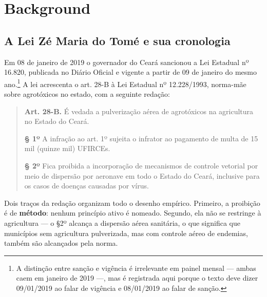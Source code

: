 %
%

\section{Background}
\label{sec:background}

\subsection{A Lei Zé Maria do Tomé e sua cronologia}
\label{sub:lei}

Em 08 de janeiro de 2019 o governador do Ceará sancionou a Lei Estadual nº
16.820, publicada no Diário Oficial e vigente a partir de 09 de janeiro do mesmo
ano.\footnote{A distinção entre sanção e vigência é irrelevante em painel mensal
--- ambas caem em janeiro de 2019 ---, mas é registrada aqui porque o texto
deve dizer 09/01/2019 ao falar de vigência e 08/01/2019 ao falar de sanção.} A lei
acrescenta o art. 28-B à Lei Estadual nº 12.228/1993, norma-mãe sobre agrotóxicos
no estado, com a seguinte redação:

\begin{quote}
\textbf{Art. 28-B.} É vedada a pulverização aérea de agrotóxicos na agricultura
no Estado do Ceará.

\textbf{§ 1º} A infração ao art. 1º sujeita o infrator ao pagamento de multa de
15 mil (quinze mil) UFIRCEs.

\textbf{§ 2º} Fica proibida a incorporação de mecanismos de controle vetorial por
meio de dispersão por aeronave em todo o Estado do Ceará, inclusive para os casos
de doenças causadas por vírus.
\end{quote}

Dois traços da redação organizam todo o desenho empírico. Primeiro, a proibição é
de \textbf{método}: nenhum princípio ativo é nomeado. Segundo, ela não se
restringe à agricultura --- o §2º alcança a dispersão aérea sanitária, o que
significa que municípios sem agricultura pulverizada, mas com controle aéreo de
endemias, também são alcançados pela norma.

